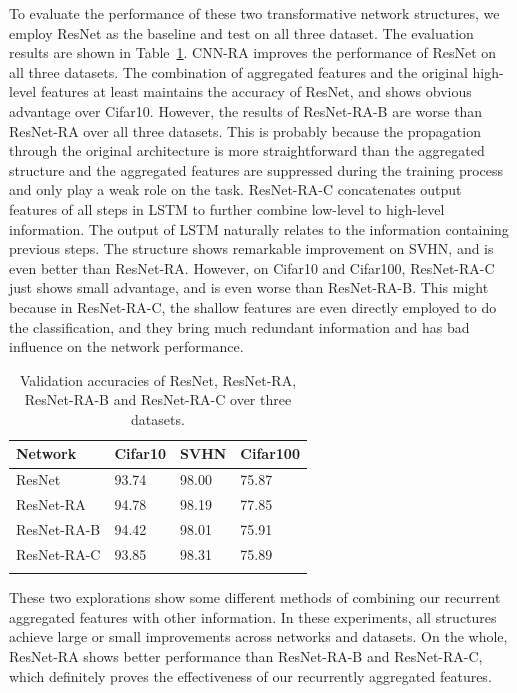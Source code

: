 \documentclass[runningheads]{llncs}
\begin{document}
To evaluate the performance of these two transformative network structures, we employ ResNet as the baseline and test on all three dataset. The evaluation results are shown in Table~\ref{table:RA-B-C}. CNN-RA improves the performance of ResNet on all three datasets. The combination of aggregated features and the original high-level features at least maintains the accuracy of ResNet, and shows obvious advantage over Cifar10. However, the results of ResNet-RA-B are worse than ResNet-RA over all three datasets. This is probably because the propagation through the original architecture is more straightforward than the aggregated structure and the aggregated features are suppressed during the training process and only play a weak role on the task. ResNet-RA-C concatenates output features of all steps in LSTM to further combine low-level to high-level information. The output of LSTM naturally relates to the information containing previous steps. The structure shows remarkable improvement on SVHN, and is even better than ResNet-RA. However, on Cifar10 and Cifar100, ResNet-RA-C just shows small advantage, and is even worse than ResNet-RA-B. This might because in ResNet-RA-C, the shallow features are even directly employed to do the classification, and they bring much redundant information and has bad influence on the network performance.
\setlength{\tabcolsep}{4pt}
\begin{table}
\begin{center}
\caption{Validation accuracies of ResNet, ResNet-RA, ResNet-RA-B and ResNet-RA-C over three datasets.}
\label{table:RA-B-C}
\begin{tabular}{l|lll}
\hline\noalign{\smallskip}
Network& Cifar10 & SVHN & Cifar100\\
\hline
ResNet &93.74  &98.00  &75.87  \\
ResNet-RA  &94.78  &98.19  &77.85  \\
ResNet-RA-B  &94.42  &98.01  &75.91  \\
ResNet-RA-C  &93.85  &98.31  &75.89  \\
\noalign{\smallskip}
\hline
\noalign{\smallskip}

\end{tabular}
\end{center}
\end{table}
\setlength{\tabcolsep}{1.4pt}

These two explorations show some different methods of combining our recurrent aggregated features with other information. In these experiments, all structures achieve large or small improvements across networks and datasets. On the whole, ResNet-RA shows better performance than ResNet-RA-B and ResNet-RA-C, which definitely proves the effectiveness of our recurrently aggregated features.
\end{document}
